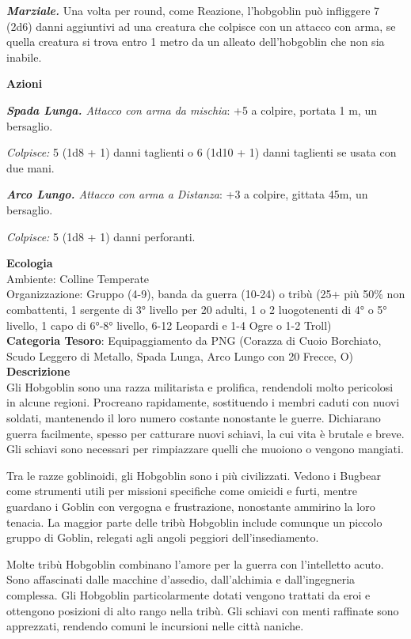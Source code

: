 \begin{multicols}{2}
{\emph{\textbf{Marziale.}} Una volta per round, come Reazione, l'hobgoblin può infliggere 7 (2d6) danni aggiuntivi ad una creatura che colpisce con un attacco con arma, se quella creatura si trova entro 1 metro da un alleato dell'hobgoblin che non sia inabile.

\textbf{Azioni}

\emph{\textbf{Spada Lunga.} Attacco con arma da mischia}: +5 a colpire, portata 1 m, un bersaglio.

\emph{Colpisce:} 5 (1d8 + 1) danni taglienti o 6 (1d10 + 1) danni taglienti se usata con due mani.

\emph{\textbf{Arco Lungo.} Attacco con arma a Distanza}: +3 a colpire, gittata 45m, un bersaglio.

\emph{Colpisce:} 5 (1d8 + 1) danni perforanti.

\textbf{Ecologia}\\
Ambiente: Colline Temperate\\
Organizzazione: Gruppo (4-9), banda da guerra (10-24) o tribù (25+ più 50\% non combattenti, 1 sergente di 3° livello per 20 adulti, 1 o 2 luogotenenti di 4° o 5° livello, 1 capo di 6°-8° livello, 6-12 Leopardi e 1-4 Ogre o 1-2 Troll)\\
\textbf{Categoria Tesoro}: Equipaggiamento da PNG (Corazza di Cuoio Borchiato, Scudo Leggero di Metallo, Spada Lunga, Arco Lungo con 20 Frecce, O)\\
\textbf{Descrizione}\\
Gli Hobgoblin sono una razza militarista e prolifica, rendendoli molto pericolosi in alcune regioni. Procreano rapidamente, sostituendo i membri caduti con nuovi soldati, mantenendo il loro numero costante nonostante le guerre. Dichiarano guerra facilmente, spesso per catturare nuovi schiavi, la cui vita è brutale e breve. Gli schiavi sono necessari per rimpiazzare quelli che muoiono o vengono mangiati.

Tra le razze goblinoidi, gli Hobgoblin sono i più civilizzati. Vedono i Bugbear come strumenti utili per missioni specifiche come omicidi e furti, mentre guardano i Goblin con vergogna e frustrazione, nonostante ammirino la loro tenacia. La maggior parte delle tribù Hobgoblin include comunque un piccolo gruppo di Goblin, relegati agli angoli peggiori dell'insediamento.

Molte tribù Hobgoblin combinano l'amore per la guerra con l'intelletto acuto. Sono affascinati dalle macchine d'assedio, dall'alchimia e dall'ingegneria complessa. Gli Hobgoblin particolarmente dotati vengono trattati da eroi e ottengono posizioni di alto rango nella tribù. Gli schiavi con menti raffinate sono apprezzati, rendendo comuni le incursioni nelle città naniche.

}
\end{multicols}
